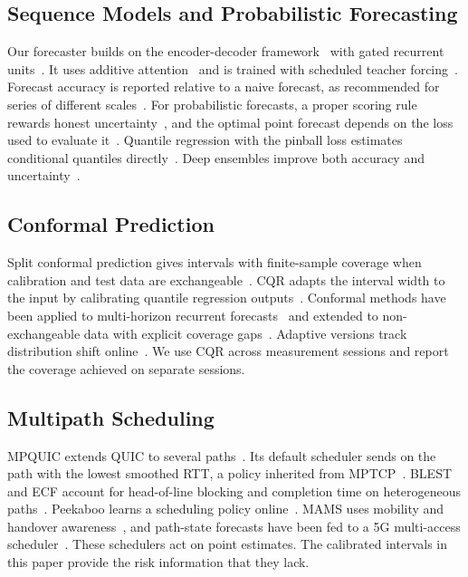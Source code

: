\subsection{Sequence Models and Probabilistic Forecasting}
Our forecaster builds on the encoder-decoder framework~\cite{sutskever2014sequence} with gated recurrent units~\cite{cho2014learning}. It uses additive attention~\cite{bahdanau2015neural} and is trained with scheduled teacher forcing~\cite{bengio2015scheduled}. Forecast accuracy is reported relative to a naive forecast, as recommended for series of different scales~\cite{hyndman2006another}. For probabilistic forecasts, a proper scoring rule rewards honest uncertainty~\cite{gneiting2007strictly}, and the optimal point forecast depends on the loss used to evaluate it~\cite{gneiting2011making}. Quantile regression with the pinball loss estimates conditional quantiles directly~\cite{koenker1978regression}. Deep ensembles improve both accuracy and uncertainty~\cite{lakshminarayanan2017simple}.

\subsection{Conformal Prediction}
Split conformal prediction gives intervals with finite-sample coverage when calibration and test data are exchangeable~\cite{lei2018distribution}. CQR adapts the interval width to the input by calibrating quantile regression outputs~\cite{romano2019conformalized}. Conformal methods have been applied to multi-horizon recurrent forecasts~\cite{stankeviciute2021conformal} and extended to non-exchangeable data with explicit coverage gaps~\cite{barber2023conformal}. Adaptive versions track distribution shift online~\cite{gibbs2021adaptive}. We use CQR across measurement sessions and report the coverage achieved on separate sessions.

\subsection{Multipath Scheduling}
MPQUIC extends QUIC to several paths~\cite{deconinck2017multipath}. Its default scheduler sends on the path with the lowest smoothed RTT, a policy inherited from MPTCP~\cite{paasch2014experimental}. BLEST and ECF account for head-of-line blocking and completion time on heterogeneous paths~\cite{ferlin2016blest,lim2017ecf}. Peekaboo learns a scheduling policy online~\cite{wu2020peekaboo}. MAMS uses mobility and handover awareness~\cite{yang2024mams}, and path-state forecasts have been fed to a 5G multi-access scheduler~\cite{maglione2025intelligent}. These schedulers act on point estimates. The calibrated intervals in this paper provide the risk information that they lack.
